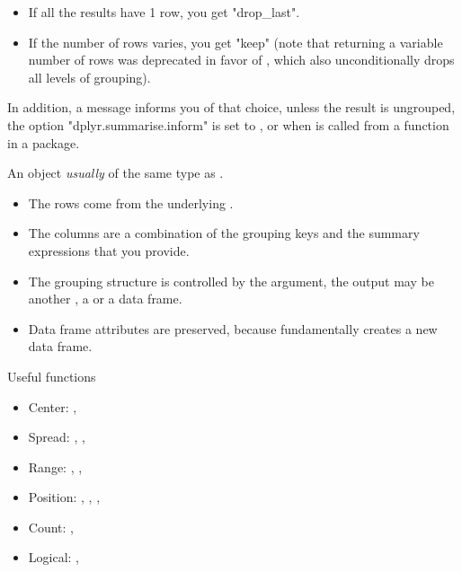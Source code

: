 \documentclass[a4paper]{book}
\begin{document}
\begin{Arguments}
\begin{ldescription}
\begin{itemize}
\item{} If all the results have 1 row, you get "drop\_last".
\item{} If the number of rows varies, you get "keep" (note that returning a
variable number of rows was deprecated in favor of , which
also unconditionally drops all levels of grouping).

\end{itemize}


In addition, a message informs you of that choice, unless the result is ungrouped,
the option "dplyr.summarise.inform" is set to ,
or when  is called from a function in a package.
\end{ldescription}
\end{Arguments}
%
\begin{Value}
An object \emph{usually} of the same type as .
\begin{itemize}

\item{} The rows come from the underlying .
\item{} The columns are a combination of the grouping keys and the summary
expressions that you provide.
\item{} The grouping structure is controlled by the  argument, the
output may be another , a  or a  data frame.
\item{} Data frame attributes are  preserved, because 
fundamentally creates a new data frame.

\end{itemize}

\end{Value}
%
\begin{Section}{Useful functions}

\begin{itemize}

\item{} Center: , 
\item{} Spread: , , 
\item{} Range: , ,
\item{} Position: , , ,
\item{} Count: , 
\item{} Logical: , 

\end{itemize}

\end{Section}
\end{document}
